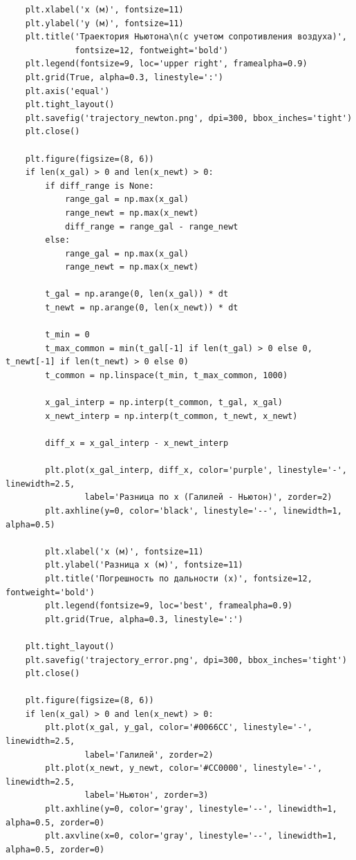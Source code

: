 \documentclass[a4paper, 14pt]{extarticle}
\begin{document}
\begin{longlisting}
\begin{verbatim}
    plt.xlabel('x (м)', fontsize=11)
    plt.ylabel('y (м)', fontsize=11)
    plt.title('Траектория Ньютона\n(с учетом сопротивления воздуха)', 
              fontsize=12, fontweight='bold')
    plt.legend(fontsize=9, loc='upper right', framealpha=0.9)
    plt.grid(True, alpha=0.3, linestyle=':')
    plt.axis('equal')
    plt.tight_layout()
    plt.savefig('trajectory_newton.png', dpi=300, bbox_inches='tight')
    plt.close()
    
    plt.figure(figsize=(8, 6))
    if len(x_gal) > 0 and len(x_newt) > 0:
        if diff_range is None:
            range_gal = np.max(x_gal)
            range_newt = np.max(x_newt)
            diff_range = range_gal - range_newt
        else:
            range_gal = np.max(x_gal)
            range_newt = np.max(x_newt)
        
        t_gal = np.arange(0, len(x_gal)) * dt
        t_newt = np.arange(0, len(x_newt)) * dt
        
        t_min = 0
        t_max_common = min(t_gal[-1] if len(t_gal) > 0 else 0, t_newt[-1] if len(t_newt) > 0 else 0)
        t_common = np.linspace(t_min, t_max_common, 1000)
        
        x_gal_interp = np.interp(t_common, t_gal, x_gal)
        x_newt_interp = np.interp(t_common, t_newt, x_newt)
        
        diff_x = x_gal_interp - x_newt_interp
        
        plt.plot(x_gal_interp, diff_x, color='purple', linestyle='-', linewidth=2.5, 
                label='Разница по x (Галилей - Ньютон)', zorder=2)
        plt.axhline(y=0, color='black', linestyle='--', linewidth=1, alpha=0.5)
        
        plt.xlabel('x (м)', fontsize=11)
        plt.ylabel('Разница x (м)', fontsize=11)
        plt.title('Погрешность по дальности (x)', fontsize=12, fontweight='bold')
        plt.legend(fontsize=9, loc='best', framealpha=0.9)
        plt.grid(True, alpha=0.3, linestyle=':')
    
    plt.tight_layout()
    plt.savefig('trajectory_error.png', dpi=300, bbox_inches='tight')
    plt.close()
    
    plt.figure(figsize=(8, 6))
    if len(x_gal) > 0 and len(x_newt) > 0:
        plt.plot(x_gal, y_gal, color='#0066CC', linestyle='-', linewidth=2.5, 
                label='Галилей', zorder=2)
        plt.plot(x_newt, y_newt, color='#CC0000', linestyle='-', linewidth=2.5, 
                label='Ньютон', zorder=3)
        plt.axhline(y=0, color='gray', linestyle='--', linewidth=1, alpha=0.5, zorder=0)
        plt.axvline(x=0, color='gray', linestyle='--', linewidth=1, alpha=0.5, zorder=0)
        

\end{verbatim}
\end{longlisting}
\end{document}
